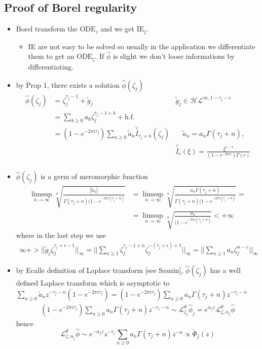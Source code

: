 \documentclass[11pt,a4paper,twoside,leqno,noamsfonts]{amsart}
\numberwithin{equation}{section}
\begin{document}
\subsection{Proof of Borel regularity}
\begin{itemize}
\item Borel transform the $\text{ODE}_z$ and we get $\text{IE}_\zeta$. 
\begin{itemize}
 \item IE are not easy to be solved so usually in the application we differentiate them to get an $\text{ODE}_\zeta$. If $\hat{\phi}$ is slight we don't loose informations by differentiating.
\end{itemize}
\item by Prop 1, there exists a solution $\hat{\phi}(\zeta_j)$ 
\begin{align*}
\hat{\phi}(\zeta_j)&=\zeta_j^{\tau_j-1}+\tilde{g}_j & \tilde{g}_j\in\mathcal{HL}^{\infty,1-\tau_j-\epsilon}\\
&=\sum_{k\geq 0}a_k\zeta_j^{\tau_j-1+k} +\text{h.f.} & \\
&=(1-e^{-2\pi i\tau_j})\sum_{n\geq 0}\tilde{a}_n\overset{\vee}{I}_{\tau_j+n}(\zeta_j) & \quad \tilde{a}_n=a_n\Gamma(\tau_j+n), \\
& & \overset{\vee}{I}_c(\xi)=\frac{\xi^{c-1}}{(1-e^{-2\pi ic})\Gamma(c)}\\
\end{align*}
\item $\hat{\phi}(\zeta_j) $ is a germ of meromorphic function
\begin{align*}
\limsup_{n\to\infty}\sqrt[n]{\frac{|\tilde{a}_n|}{\Gamma(\tau_j+n)(1-e^{-2\pi i(\tau_j+n)}}}&=\limsup_{n\to\infty}\sqrt[n]{\frac{{a}_n\Gamma(\tau_j+n)}{\Gamma(\tau_j+n)(1-e^{-2\pi i(\tau_j+n)}}}=\\
&=\limsup_{n\to\infty}\sqrt[n]{\frac{{a}_n}{(1-e^{-2\pi i(\tau_j+n)}}}<+\infty
\end{align*}
 where in the last step we use 
 \begin{multline}
 \infty+>||\tilde{g}_j \zeta_j^{\tau_j+\epsilon-1}||_\infty=||\sum_{n\geq 1}\zeta_j^{\tau_j-1+n}\zeta_j^{-(\tau_j+\epsilon)+1} ||_\infty=||\sum_{n\geq 1}a_n\zeta_j^{n-\varepsilon}||_\infty
 \end{multline}
 \item by Ecalle definition of Laplace transform [see Sauzin], $\hat{\phi}(\zeta_j)$ has a well defined Laplace transform which is asymptotic to $\sum_{n\geq 0}\tilde{a}_nz^{-\tau_j-n}(1-e^{-2\pi i \tau_j})=(1-e^{-2\pi i \tau_j})\sum_{n\geq 0}a_n\Gamma(\tau_j+n)z^{-\tau_j-n}$
 \begin{align*}
 (1-e^{-2\pi i \tau_j})\sum_{n\geq 0}a_n\Gamma(\tau_j+n)z^{-\tau_j-n}\sim \mathcal{L}_{\zeta_j}^\theta\hat{\phi}_j=e^{\alpha_jz}\mathcal{L}_{\zeta,\alpha_j}^\theta\hat{\phi}
 \end{align*}
 hence 
 \begin{equation}
 \mathcal{L}_{\zeta,\alpha_j}^\theta\hat{\phi} \sim e^{-\alpha_jz}z^{-\tau_j} \sum_{n\geq 0}a_n\Gamma(\tau_j+n)z^{-n}\propto \tilde{\Phi}_j(z)
 \end{equation}
\end{itemize}
\end{document}
